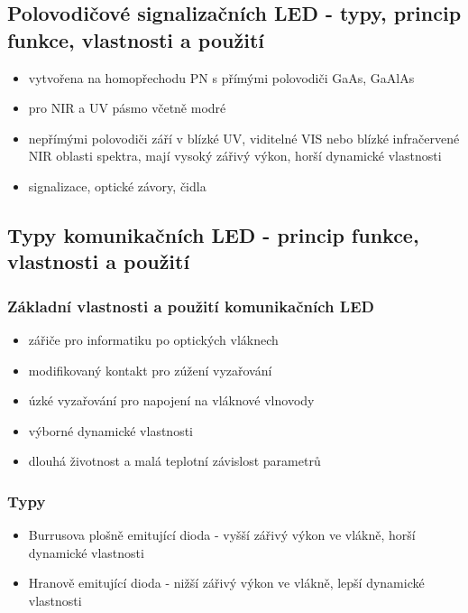 \documentclass[a4paper, 12pt]{article}
\begin{document}
        \subsection{Polovodičové signalizačních LED - typy, princip funkce, vlastnosti a použití}
            \begin{itemize}
                \item vytvořena na homopřechodu PN s přímými polovodiči GaAs, GaAlAs
                \item pro NIR a UV pásmo včetně modré
                \item nepřímými polovodiči září v blízké UV, viditelné VIS nebo blízké infračervené NIR oblasti spektra, mají vysoký zářivý výkon, horší dynamické vlastnosti
                \item signalizace, optické závory, čidla
            \end{itemize}
        
        \subsection{Typy komunikačních LED - princip funkce, vlastnosti a použití}
            \subsubsection{Základní vlastnosti a použití komunikačních LED}
            \begin{itemize}
                \item zářiče pro informatiku po optických vláknech
                \item modifikovaný kontakt pro zúžení vyzařování
                \item úzké vyzařování pro napojení na vláknové vlnovody
                \item výborné dynamické vlastnosti
                \item dlouhá životnost a malá teplotní závislost parametrů
            \end{itemize}
            \subsubsection{Typy}
            \begin{itemize}
                \item Burrusova plošně emitující dioda - vyšší zářivý výkon ve vlákně, horší dynamické vlastnosti
                \item Hranově emitující dioda - nižší zářivý výkon ve vlákně, lepší dynamické vlastnosti
            \end{itemize}
        
\end{document}
